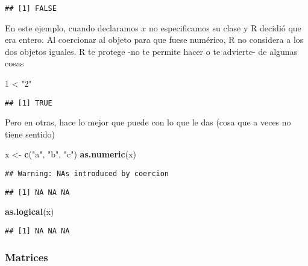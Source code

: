 \documentclass[]{article}
\newenvironment{Shaded}{\begin{snugshade}}{\end{snugshade}}
\newcommand{\KeywordTok}[1]{\textcolor[rgb]{0.13,0.29,0.53}{\textbf{{#1}}}}
\newcommand{\DecValTok}[1]{\textcolor[rgb]{0.00,0.00,0.81}{{#1}}}
\newcommand{\StringTok}[1]{\textcolor[rgb]{0.31,0.60,0.02}{{#1}}}
\newcommand{\NormalTok}[1]{{#1}}
\begin{document}
\begin{verbatim}
## [1] FALSE
\end{verbatim}

En este ejemplo, cuando declaramos \(x\) no especificamos su clase y R
decidió que era entero. Al coercionar al objeto para que fuese numérico,
R no considera a los dos objetos iguales. R te protege -no te permite
hacer o te advierte- de algunas cosas

\begin{Shaded}
\begin{Highlighting}[]
\DecValTok{1} \NormalTok{<}\StringTok{ "2"}
\end{Highlighting}
\end{Shaded}

\begin{verbatim}
## [1] TRUE
\end{verbatim}

Pero en otras, hace lo mejor que puede con lo que le das (cosa que a
veces no tiene sentido)

\begin{Shaded}
\begin{Highlighting}[]
\NormalTok{x <-}\StringTok{ }\KeywordTok{c}\NormalTok{(}\StringTok{"a"}\NormalTok{, }\StringTok{"b"}\NormalTok{, }\StringTok{"c"}\NormalTok{)}
\KeywordTok{as.numeric}\NormalTok{(x)}
\end{Highlighting}
\end{Shaded}

\begin{verbatim}
## Warning: NAs introduced by coercion
\end{verbatim}

\begin{verbatim}
## [1] NA NA NA
\end{verbatim}

\begin{Shaded}
\begin{Highlighting}[]
\KeywordTok{as.logical}\NormalTok{(x)}
\end{Highlighting}
\end{Shaded}

\begin{verbatim}
## [1] NA NA NA
\end{verbatim}

\subsubsection{Matrices}\label{matrices}
\end{document}
